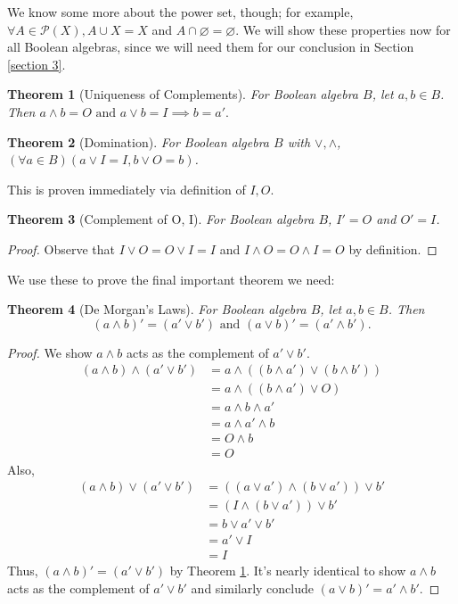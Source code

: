 \documentclass[10pt, letterpaper]{article}
\newcommand{\powerset}[1]{\mathcal{P}(#1)}
\newcommand{\intersect}{\cap}
\newtheorem{theorem}{Theorem}
\theoremstyle{definition}
\begin{document}
We know some more about the power set, though; for example,
\(\forall A\in\powerset{X}, A\cup X = X\) and 
\(A\intersect\varnothing = \varnothing\).
We will show these properties now for all Boolean algebras,
since we will need them for our conclusion in Section \ref{section 3}.

\begin{theorem}[Uniqueness of Complements]\label{thm_uniq_compl}
	For Boolean algebra \(B\), let \(a,b\in B\). Then
	\(a\wedge b = O\text{ and }a\vee b = I\implies b = a'.\)
\end{theorem}
\begin{theorem}[Domination]\label{thm_domination}
	For Boolean algebra \(B\) with \(\vee,\wedge\),
	\((\forall a\in B)(a\vee I = I, b\vee O = b)\).
\end{theorem}
This is proven immediately via definition of \(I,O\).
\begin{theorem}[Complement of O, I]
	For Boolean algebra \(B\), \(I'=O\) and \(O'=I\).
\end{theorem}
\begin{proof}
	Observe that \(I\vee O=O\vee I=I\) and \(I\wedge O=O\wedge I=O\) by definition.
\end{proof}

We use these to prove the final important theorem we need:
\begin{theorem}[De Morgan's Laws]
	For Boolean algebra \(B\), let \(a,b\in B\). Then
	\[(a\wedge b)'=(a'\vee b')\text{ and }(a\vee b)'=(a'\wedge b').\]
\end{theorem}
\begin{proof}
	We show \(a\wedge b\) acts as the complement of \(a'\vee b'\).
	\begin{align*}
		(a\wedge b)\wedge(a'\vee b')&=a\wedge((b\wedge a')\vee(b\wedge b'))\\
									&=a\wedge((b\wedge a')\vee O)\\
									&=a\wedge b\wedge a' \\
									&=a\wedge a'\wedge b \\
									&=O\wedge b\\
									&=O
	\end{align*}
	Also,
	\begin{align*}
		(a\wedge b)\vee(a'\vee b')&=((a\vee a')\wedge(b\vee a'))\vee b'\\
								  &=(I\wedge(b\vee a'))\vee b'\\
								  &=b\vee a'\vee b'\\
								  &=a'\vee I\\
								  &=I
	\end{align*}
	Thus, \((a\wedge b)'=(a'\vee b')\) by Theorem \ref{thm_uniq_compl}.
	It's nearly identical to show \(a\wedge b\) acts as the complement of \(a'\vee b'\)
	and similarly conclude \((a\vee b)'=a'\wedge b'\).
\end{proof}
\end{document}
